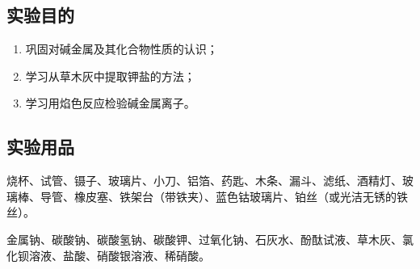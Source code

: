 \subsection*{实验目的}
\begin{enumerate}[1.]
  \item 巩固对碱金属及其化合物性质的认识；
  \item 学习从草木灰中提取钾盐的方法；
  \item 学习用焰色反应检验碱金属离子。
\end{enumerate}
\subsection*{实验用品}
烧杯、试管、镊子、玻璃片、小刀、铝箔、药匙、木条、漏斗、滤纸、酒精灯、玻璃棒、导管、橡皮塞、铁架台（带铁夹）、蓝色钴玻璃片、铂丝（或光洁无锈的铁丝）。

金属钠、碳酸钠、碳酸氢钠、碳酸钾、过氧化钠、石灰水、酚酞试液、草木灰、氯化钡溶液、盐酸、硝酸银溶液、稀硝酸。


